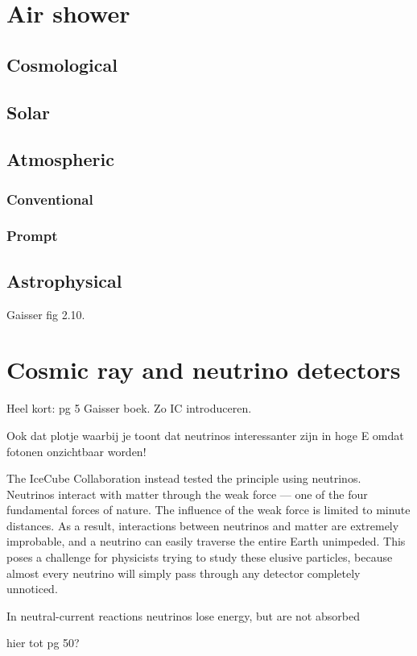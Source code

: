 \section{Air shower}
\subsection{Cosmological}
\subsection{Solar}
\subsection{Atmospheric}
\subsubsection{Conventional}
\subsubsection{Prompt}
\subsection{Astrophysical}
Gaisser fig 2.10.
\section{Cosmic ray and neutrino detectors}
Heel kort: pg 5 Gaisser boek. Zo IC introduceren.

Ook dat plotje waarbij je toont dat neutrinos interessanter zijn in hoge E omdat fotonen onzichtbaar worden!

The IceCube Collaboration instead tested the principle using neutrinos. Neutrinos interact with matter through the weak force — one of the four fundamental forces of nature. The influence of the weak force is limited to minute distances. As a result, interactions between neutrinos and matter are extremely improbable, and a neutrino can easily traverse the entire Earth unimpeded. This poses a challenge for physicists trying to study these elusive particles, because almost every neutrino will simply pass through any detector completely unnoticed.




In neutral-current reactions neutrinos lose energy, but are not absorbed

hier tot pg 50?